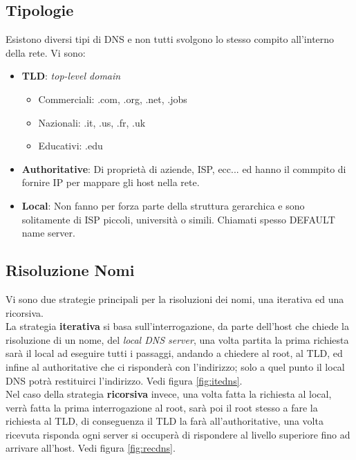 \documentclass[12pt]{article}
\begin{document}
\subsection{Tipologie} %
Esistono diversi tipi di DNS e non tutti svolgono lo stesso compito all'interno della rete.
Vi sono:
\begin{itemize}
  \item \textbf{TLD}: \textit{top-level domain}
  \begin{itemize}
    \item Commerciali: .com, .org, .net, .jobs
    \item Nazionali: .it, .us, .fr, .uk
    \item Educativi: .edu
  \end{itemize}
  \item \textbf{Authoritative}: Di proprietà di aziende, ISP, ecc... ed hanno il commpito di fornire IP per mappare gli host nella rete.
  \item \textbf{Local}: Non fanno per forza parte della struttura gerarchica e sono solitamente di ISP piccoli, università o simili. Chiamati spesso DEFAULT name server.
\end{itemize}

\subsection{Risoluzione Nomi}\label{subsec:dnsresolution} %
Vi sono due strategie principali per la risoluzioni dei nomi, una iterativa ed una ricorsiva.\\
La strategia \textbf{iterativa} si basa sull'interrogazione, da parte dell'host che chiede la risoluzione di un nome, del \textit{local DNS server}, una volta partita la prima richiesta sarà il local ad eseguire tutti i passaggi, andando a chiedere al root, al TLD, ed infine al authoritative che ci risponderà con l'indirizzo; solo a quel punto il local DNS potrà restituirci l'indirizzo. Vedi figura \ref{fig:itedns}.\\
Nel caso della strategia \textbf{ricorsiva} invece, una volta fatta la richiesta al local, verrà fatta la prima interrogazione al root, sarà poi il root stesso a fare la richiesta al TLD, di conseguenza il TLD la farà all'authoritative, una volta ricevuta risponda ogni server si occuperà di rispondere al livello superiore fino ad arrivare all'host. Vedi figura \ref{fig:recdns}.
\end{document}

